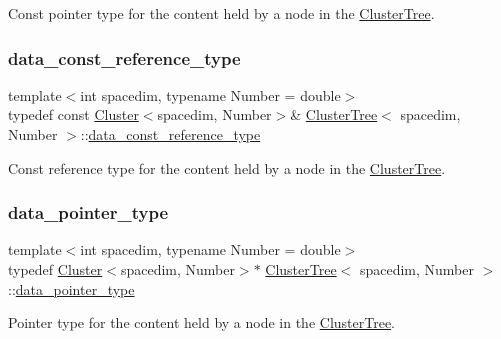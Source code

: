 Const pointer type for the content held by a node in the \hyperlink{classClusterTree}{Cluster\+Tree}. \mbox{\label{classClusterTree_a1d171cbb6b0a8367b4be0d2b87bc9ba8}} 
\subsubsection{\texorpdfstring{data\+\_\+const\+\_\+reference\+\_\+type}{data\_const\_reference\_type}}
{\footnotesize\ttfamily template$<$int spacedim, typename Number = double$>$ \\
typedef const \hyperlink{classCluster}{Cluster}$<$spacedim, Number$>$\& \hyperlink{classClusterTree}{Cluster\+Tree}$<$ spacedim, Number $>$\+::\hyperlink{classClusterTree_a1d171cbb6b0a8367b4be0d2b87bc9ba8}{data\+\_\+const\+\_\+reference\+\_\+type}}

Const reference type for the content held by a node in the \hyperlink{classClusterTree}{Cluster\+Tree}. \mbox{\label{classClusterTree_a87fee1708c95c5575fce3029b79d32a8}} 
\subsubsection{\texorpdfstring{data\+\_\+pointer\+\_\+type}{data\_pointer\_type}}
{\footnotesize\ttfamily template$<$int spacedim, typename Number = double$>$ \\
typedef \hyperlink{classCluster}{Cluster}$<$spacedim, Number$>$$\ast$ \hyperlink{classClusterTree}{Cluster\+Tree}$<$ spacedim, Number $>$\+::\hyperlink{classClusterTree_a87fee1708c95c5575fce3029b79d32a8}{data\+\_\+pointer\+\_\+type}}

Pointer type for the content held by a node in the \hyperlink{classClusterTree}{Cluster\+Tree}. \mbox{\label{classClusterTree_ae47bb5a21c1468972b1c2ede0e8aa28c}} 
